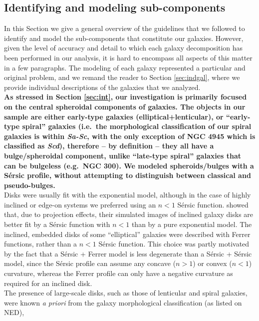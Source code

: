 \documentclass[preprint2]{emulateapj}
\begin{document}
\subsection{Identifying and modeling sub-components}
\label{sec:cpts}
In this Section we give a general overview of the guidelines that we followed to identify and model 
the sub-components that constitute our galaxies. 
However, given the level of accuracy and detail to which each galaxy decomposition has been performed in our analysis,
it is hard to encompass all aspects of this matter in a few paragraphs.
The modeling of each galaxy represented a particular and original problem, 
and we remand the reader to Section \ref{sec:indgal},
where we provide individual descriptions of the galaxies that we analyzed. \\
{\bf As stressed in Section \ref{sec:int}, our investigation is primarily focused on the central spheroidal components 
of galaxies. 
The objects in our sample are either early-type galaxies (elliptical+lenticular), 
or ``early-type spiral'' galaxies 
(i.e.~the morphological classification of our spiral galaxies is within \emph{Sa-Sc}, 
with the only exception of NGC 4945 which is classified as \emph{Scd}), 
therefore -- by definition -- they all have a bulge/spheroidal component, 
unlike ``late-type spiral'' galaxies that can be bulgeless (e.g.~NGC 300).   
We modeled spheroids/bulges with a S\'ersic profile, without attempting to distinguish between classical and pseudo-bulges. } \\
Disks were usually fit with the exponential model, 
although in the case of highly inclined or edge-on systems we preferred using an $n < 1$ S\'ersic function. 
\citet{pastrav2013a,pastrav2013b} showed that, due to projection effects, their simulated images of inclined galaxy disks 
are better fit by a S\'ersic function with $n < 1$ than by a pure exponential model.
The inclined, embedded disks of some ``elliptical'' galaxies were described with Ferrer functions, rather than a $n < 1$ S\'ersic function. 
This choice was partly motivated by the fact that a S\'ersic + Ferrer model is less degenerate than a S\'ersic + S\'ersic model, 
since the S\'ersic profile can assume any concave ($n > 1$) or convex ($n < 1$) curvature, 
whereas the Ferrer profile can only have a negative curvature as required for an inclined disk. \\
The presence of large-scale disks, such as those of lenticular and spiral galaxies, 
were known \emph{a priori} from the galaxy morphological classification (as listed on NED), 
\end{document}
